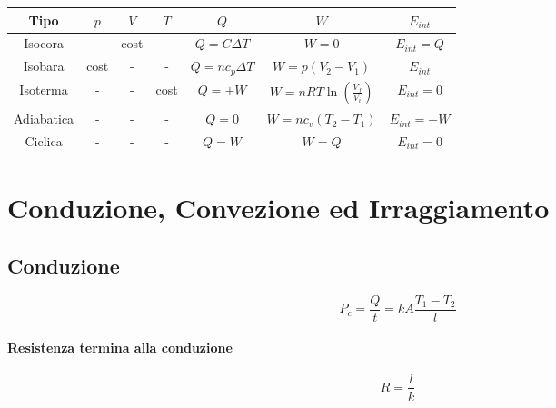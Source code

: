             \begin{tabular}{ |c|c|c|c|c|c|c| } 
                \hline
                    \textbf{Tipo} & $p$ & $V$ & $T$ & $Q$ & $W$ & $E_{int}$ \\
                \hline
                    Isocora 
                        & - 
                        & cost 
                        & - 
                        & $Q = C\Delta T$ 
                        & $W = 0$
                        & $E_{int} = Q$ \\
                \hline
                    Isobara
                        & cost
                        & - 
                        & - 
                        & $Q = nc_p\Delta T$
                        & $W = p(V_2 - V_1)$
                        & $E_{int}$ \\
                \hline
                    Isoterma
                        & -
                        & - 
                        & cost
                        & $Q = + W$
                        & $W = nRT\ln(\frac{V_f}{V_i})$
                        & $E_{int} = 0$ \\
                \hline
                    Adiabatica
                        & -
                        & - 
                        & -
                        & $Q = 0$
                        & $W = nc_v(T_2 - T_1)$
                        & $E_{int} = -W$ \\
                \hline
                    Ciclica
                        & -
                        & - 
                        & -
                        & $Q = W$
                        & $W = Q$
                        & $E_{int} = 0$ \\
                \hline
            \end{tabular}

        \section*{Conduzione, Convezione ed Irraggiamento} 

            \subsection*{Conduzione}
                \begin{equation*}
                    P_c = \frac{Q}{t} = kA\frac{T_1 - T_2}{l}
                \end{equation*}

            \paragraph{Resistenza termina alla conduzione}
                \begin{equation*}
                    R = \frac{l}{k}
                \end{equation*}

